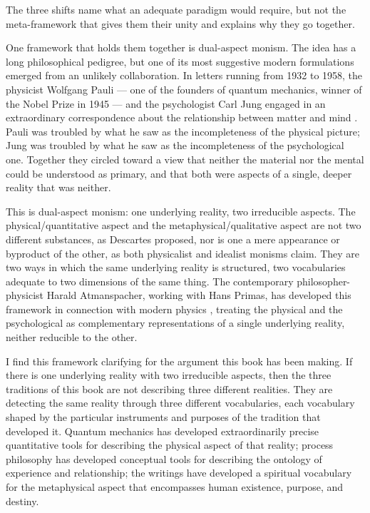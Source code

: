 The three shifts name what an adequate paradigm would require, but not the
meta-framework that gives them their unity and explains why they go together.

One framework that holds them together is dual-aspect monism. The idea has a
long philosophical pedigree, but one of its most suggestive modern formulations
emerged from an unlikely collaboration. In letters running from 1932 to 1958,
the physicist Wolfgang Pauli --- one of the founders of
quantum mechanics, winner of the Nobel Prize in 1945 --- and the psychologist Carl Jung engaged in an extraordinary correspondence about the relationship between matter and mind \citep{PauliJung2001}. Pauli was troubled by what he saw as the incompleteness of the physical picture; Jung was troubled by what he saw as the incompleteness of the psychological one. Together they circled toward a view that neither the material nor the mental could be understood as primary, and that both were aspects of a single, deeper reality that was neither.

This is dual-aspect monism: one underlying reality, two irreducible aspects.
The physical/quantitative aspect and the metaphysical/qualitative aspect are
not two different substances, as Descartes proposed, nor is one a mere
appearance or byproduct of the other, as both physicalist and idealist
monisms claim. They are two ways in which the same underlying reality is
structured, two vocabularies adequate to two dimensions of the same thing.
The contemporary philosopher-physicist Harald Atmanspacher, working with Hans
Primas, has developed this framework in connection with modern physics
\citep{AtmanspacherPrimas2006}, treating the physical and the psychological as
complementary representations of a single underlying reality, neither reducible
to the other.

I find this framework clarifying for the argument this book has been making.
If there is one underlying reality with two irreducible aspects, then the
three traditions of this book are not describing three different realities.
They are
detecting the same reality through three different vocabularies, each vocabulary
shaped by the particular instruments and purposes of the tradition that
developed it. Quantum mechanics has developed extraordinarily precise
quantitative tools for describing the physical aspect of that reality; process
philosophy has developed conceptual tools for describing the ontology of
experience and relationship; the \bahai writings have developed a spiritual
vocabulary for the metaphysical aspect that encompasses human existence, purpose,
and destiny.

